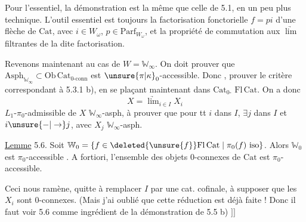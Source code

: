 Pour l'essentiel, la démonstration est la même que celle de 5.1, en un peu plus technique. L'outil essentiel est toujours la factorisation fonctorielle $f=pi$  d'une flèche de $\mathrm{Cat}$, avec $i\in W_\omega$, $p\in\mathrm{Parf}_{W_\omega}$, et la propriété de
commutation aux $\underrightarrow{\lim}$ filtrantes de la dite factorisation.

Revenons maintenant au cas de $W=\mathbb W_\infty$. On doit prouver que $\mathrm{Asph}_{\mathbb W_\infty}\subset\mathrm{Ob}\,\mathrm{Cat}_{0\text{-conn}}$ est $\unsure{\pi|\kappa}_0$-accessible. Donc , prouver le critère correspondant à 5.3.1 b), en se plaçant maintenant dans $\mathrm{Cat}_{0\text{-}}$  $\mathrm{Fl}\,\mathrm{Cat}$. On a donc
\[
X=\underrightarrow{\lim}_{i\in I}X_i
\]
 $L_1$-$\pi_0$-admissible de $X$ $\mathbb W_\infty$-asph, à prouver que pour tt $i$ dans $I$, $\exists j$ dans $I$ et $i\unsure{\mathbin{-}|\to}j$, avec $X_j$ $\mathbb W_\infty$-asph.  \inserted{$\big[$J'admets ici les lemmes. \unsure{AQT|AGT}}

\uline{Lemme} 5.6. Soit $\mathbb W_0=\{f\in\deleted{\unsure{f}}\mathrm{Fl}\,\mathrm{Cat}\mid \pi_0(f)\ \text{iso}\}$. Alors $\mathbb W_0$ est  $\pi_0$-accessible . A fortiori, l'ensemble des objets $0$-connexes de $\mathrm{Cat}$ est $\pi_0$-accessible.

Ceci nous ramène, quitte à remplacer $I$ par une cat. cofinale, à supposer que les $X_i$ sont $0$-connexes. (Mais j'ai oublié que cette réduction est déjà faite ! Donc il faut voir 5.6 comme ingrédient
de la démonstration de 5.5 b) $\big]\!\big]$

